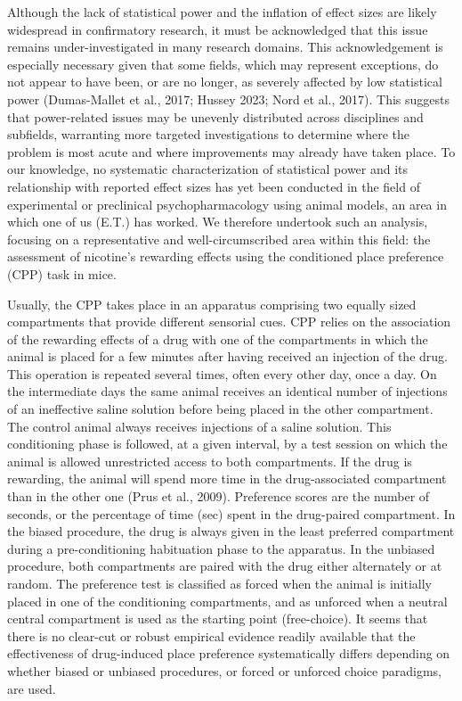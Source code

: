 \documentclass[authordate, meta, issue]{jote-new-article}
\begin{document}
	Although the lack of statistical power and the inflation of effect sizes are likely widespread in confirmatory research, it must be acknowledged that this issue remains under-investigated in many research domains. This acknowledgement is especially necessary given that some fields, which may represent exceptions, do not appear to have been, or are no longer, as severely affected by low statistical power (Dumas-Mallet et al., 2017; Hussey 2023; Nord et al., 2017). This suggests that power-related issues may be unevenly distributed across disciplines and subfields, warranting more targeted investigations to determine where the problem is most acute and where improvements may already have taken place. To our knowledge, no systematic characterization of statistical power and its relationship with reported effect sizes has yet been conducted in the field of experimental or preclinical psychopharmacology using animal models, an area in which one of us (E.T.) has worked. We therefore undertook such an analysis, focusing on a representative and well-circumscribed area within this field: the assessment of nicotine's rewarding effects using the conditioned place preference (CPP) task in mice.



	Usually, the CPP takes place in an apparatus comprising two equally sized compartments that provide different sensorial cues. CPP relies on the association of the rewarding effects of a drug with one of the compartments in which the animal is placed for a few minutes after having received an injection of the drug. This operation is repeated several times, often every other day, once a day. On the intermediate days the same animal receives an identical number of injections of an ineffective saline solution before being placed in the other compartment. The control animal always receives injections of a saline solution. This conditioning phase is followed, at a given interval, by a test session on which the animal is allowed unrestricted access to both compartments. If the drug is rewarding, the animal will spend more time in the drug-associated compartment than in the other one (Prus et al., 2009). Preference scores are the number of seconds, or the percentage of time (sec) spent in the drug-paired compartment. In the biased procedure, the drug is always given in the least preferred compartment during a pre-conditioning habituation phase to the apparatus. In the unbiased procedure, both compartments are paired with the drug either alternately or at random. The preference test is classified as forced when the animal is initially placed in one of the conditioning compartments, and as unforced when a neutral central compartment is used as the starting point (free-choice). It seems that there is no clear-cut or robust empirical evidence readily available that the effectiveness of drug-induced place preference systematically differs depending on whether biased or unbiased procedures, or forced or unforced choice paradigms, are used.
\end{document}
